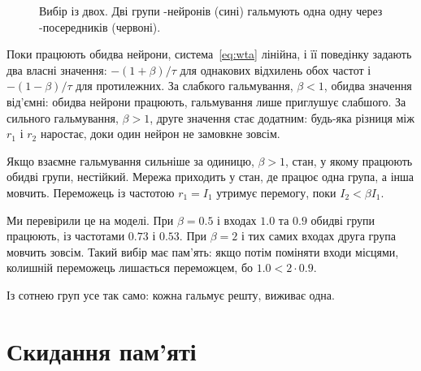 \begin{figure}[t]
\centering
{}
\caption{Вибір із двох. Дві групи -нейронів (сині) гальмують одна одну через -посередників (червоні).}
\label{fig:wta}
\end{figure}

Поки працюють обидва нейрони, система~\eqref{eq:wta} лінійна, і її поведінку задають два власні значення: $-(1+\beta)/\tau$ для однакових відхилень обох частот і $-(1-\beta)/\tau$ для протилежних. За слабкого гальмування, $\beta<1$, обидва значення від'ємні: обидва нейрони працюють, гальмування лише приглушує слабшого. За сильного гальмування, $\beta>1$, друге значення стає додатним: будь-яка різниця між $r_1$ і $r_2$ наростає, доки один нейрон не замовкне зовсім.

\begin{keyblock}
\begin{proposition}
\label{prop:wta}
Якщо взаємне гальмування сильніше за одиницю, $\beta>1$, стан, у якому працюють обидві групи, нестійкий. Мережа приходить у стан, де працює одна група, а інша мовчить. Переможець із частотою $r_1=I_1$ утримує перемогу, поки $I_2<\beta I_1$.
\end{proposition}
\end{keyblock}

Ми перевірили це на моделі. При $\beta=0.5$ і входах $1.0$ та $0.9$ обидві групи працюють, із частотами $0.73$ і $0.53$. При $\beta=2$ і тих самих входах друга група мовчить зовсім. Такий вибір має пам'ять: якщо потім поміняти входи місцями, колишній переможець лишається переможцем, бо $1.0<2\cdot0.9$.

Із сотнею груп усе так само: кожна гальмує решту, виживає одна.

\section{Скидання пам'яті}

